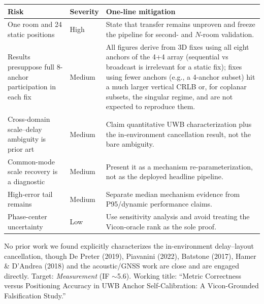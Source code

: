 \documentclass[10pt,a4paper]{article}
\makeatletter
\renewcommand\section{\@startsection{section}{1}{0pt}{0.65ex plus .2ex}{0.35ex}{\normalfont\normalsize\bfseries}}
\makeatother
\begin{document}
\section{Risk and Status}

\begin{center}
\scriptsize
\begin{tabularx}{\textwidth}{@{}>{\raggedright\arraybackslash}p{34mm}>{\raggedright\arraybackslash}p{19mm}>{\raggedright\arraybackslash}X@{}}
\toprule
Risk & Severity & One-line mitigation \\
\midrule
One room and 24 static positions & High & State that transfer remains unproven and freeze the pipeline for second- and $N$-room validation. \\
Results presuppose full 8-anchor participation in each fix & Medium & All figures derive from 3D fixes using all eight anchors of the 4+4 array (sequential vs broadcast is irrelevant for a static fix); fixes using fewer anchors (e.g., a 4-anchor subset) hit a much larger vertical CRLB or, for coplanar subsets, the singular regime, and are not expected to reproduce them. \\
Cross-domain scale--delay ambiguity is prior art & Medium & Claim quantitative UWB characterization plus the in-environment cancellation result, not the bare ambiguity. \\
Common-mode scale recovery is a diagnostic & Medium & Present it as a mechanism re-parameterization, not as the deployed headline pipeline. \\
High-error tail remains & Medium & Separate median mechanism evidence from P95/dynamic performance claims. \\
Phase-center uncertainty & Low & Use sensitivity analysis and avoid treating the Vicon-oracle rank as the sole proof. \\
\bottomrule
\end{tabularx}
\end{center}

No prior work we found explicitly characterizes the in-environment delay--layout cancellation, though De Preter (2019), Piavanini (2022), Batstone (2017), Hamer \& D'Andrea (2018) and the acoustic/GNSS work are close and are engaged directly. Target: \emph{Measurement} (IF $\sim$5.6). Working title: ``Metric Correctness versus Positioning Accuracy in UWB Anchor Self-Calibration: A Vicon-Grounded Falsification Study.''
\end{document}
